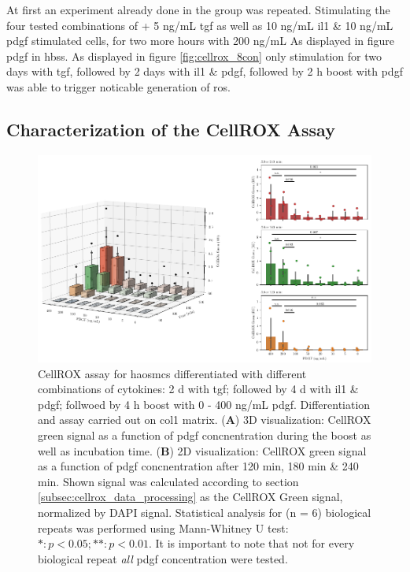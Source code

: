     At first an experiment already done in the group was repeated. Stimulating the four tested combinations of + 5 ng/mL \ac{tgf} as well as 10 ng/mL  \ac{il1} \& 10 ng/mL  \ac{pdgf} stimulated cells, for two more hours with 200 ng/mL As displayed in figure \ac{pdgf} in \ac{hbss}. As displayed in figure \ref{fig:cellrox_8con} only stimulation for two days with \ac{tgf}, followed by 2 days with \ac{il1} \& \ac{pdgf}, followed by 2 h boost with \ac{pdgf} was able to trigger noticable generation of \ac{ros}.

    \subsection{Characterization of the CellROX Assay}
    \begin{figure}[h!]
    \capstart
        \centering
    	\includegraphics{Abbildung/CellROX_titration_no_norm.pdf}

    	\begin{minipage}{\captionwidth}
    		\caption[cellROX_titration]{ \newline
            CellROX assay for \acp{haosmc} differentiated with different combinations of cytokines: 2 d with \ac{tgf}; followed by 4 d with \ac{il1} \& \ac{pdgf}; follwoed by 4 h boost with 0 - 400 ng/mL \ac{pdgf}. Differentiation and assay carried out on \ac{col1} matrix.
            (\textbf{A}) 3D visualization: CellROX green signal as a function of \ac{pdgf} concnentration during the boost as well as incubation time.
            (\textbf{B}) 2D visualization: CellROX green signal as a function of \ac{pdgf} concnentration after 120 min, 180 min \& 240 min.
            Shown signal was calculated according to section \ref{subsec:cellrox_data_processing} as the CellROX Green signal, normalized by DAPI signal. Statistical analysis for (n = 6) biological repeats was performed using Mann-Whitney U test: $*: p < 0.05; **: p < 0.01$. It is important to note that not for every biological repeat \textit{all} \ac{pdgf} concentration were tested. }
    		\label{fig:cellROX_titration}
    	\end{minipage}
    \end{figure}

